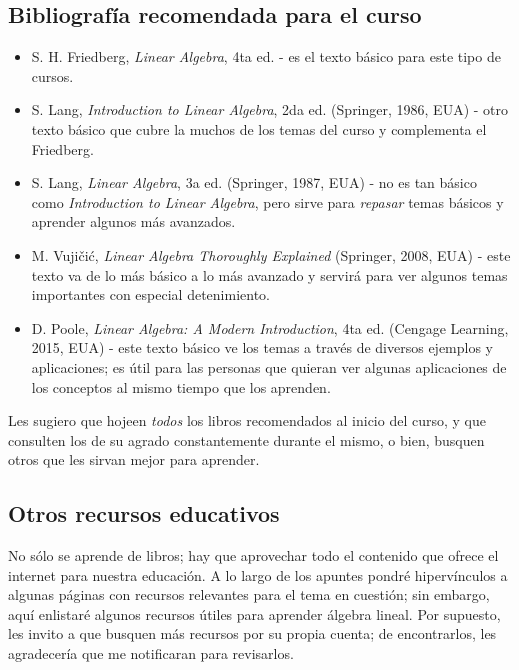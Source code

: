 \documentclass[12pt]{article}
\begin{document}
\subsection{Bibliografía recomendada para el curso} \label{Bibliografía}

\begin{itemize}
    \item S. H. Friedberg, \emph{Linear Algebra}, 4ta ed. - es el texto básico para este tipo de cursos.
    \item S. Lang, \emph{Introduction to Linear Algebra}, 2da ed. (Springer, 1986, EUA) - otro texto básico que cubre la muchos de los temas del curso y complementa el Friedberg.
    \item S. Lang, \emph{Linear Algebra}, 3a ed. (Springer, 1987, EUA) - no es tan básico como \emph{Introduction to Linear Algebra}, pero sirve para \emph{repasar} temas básicos y aprender algunos más avanzados.
    \item M. Vujičić, \emph{Linear Algebra Thoroughly Explained} (Springer, 2008, EUA) - este texto va de lo más básico a lo más avanzado y servirá para ver algunos temas importantes con especial detenimiento.
    \item D. Poole, \emph{Linear Algebra: A Modern Introduction}, 4ta ed. (Cengage Learning, 2015, EUA) - este texto básico ve los temas a través de diversos ejemplos y aplicaciones; es útil para las personas que quieran ver algunas aplicaciones de los conceptos al mismo tiempo que los aprenden.
\end{itemize}{}

Les sugiero que hojeen \emph{todos} los libros recomendados al inicio del curso, y que consulten los de su agrado constantemente durante el mismo, o bien, busquen otros que les sirvan mejor para aprender.

\subsection{Otros recursos educativos}

No sólo se aprende de libros; hay que aprovechar todo el contenido que ofrece el internet para nuestra educación. A lo largo de los apuntes pondré hipervínculos a algunas páginas con recursos relevantes para el tema en cuestión; sin embargo, aquí enlistaré algunos recursos útiles para aprender álgebra lineal. Por supuesto, les invito a que busquen más recursos por su propia cuenta; de encontrarlos, les agradecería que me notificaran para revisarlos.
\end{document}
